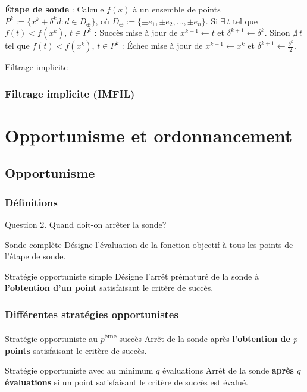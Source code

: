 \documentclass{beamer}
\newcommand\tab[1][1cm]{\hspace*{#1}}
\newcommand{\IMFIL}{\textsf{IMFIL}}
\begin{document}
\begin{frame}
\begin{algorithm}[H]
\begin{algorithmic}[]
\STATE \textbf{Étape de sonde} : Calcule $f(x)$ à un ensemble de points
\STATE $P^k:=\{x^k+\delta ^k d:d\in D_{\oplus}\}$, où $D_{\oplus} := \{\pm e_1,\pm e_2,\dots,\pm e_n\}$.
\STATE
\STATE Si $\exists~t$ tel que $f(t) < f(x^k)$, $t\in P^k$ : Succès
\STATE \tab mise à jour de $x^{k+1}\leftarrow t$ et $\delta^{k+1} \leftarrow \delta^k$.
\STATE
\STATE Sinon $\nexists~t$ tel que $f(t) < f(x^k)$, $t\in P^k$ : Échec
\STATE \tab mise à jour de $x^{k+1}\leftarrow x^k$ et $\delta^{k+1} \leftarrow \frac{\delta^k}{2}$.
\ENDFOR
\end{algorithmic}
\caption{Filtrage implicite}
\label{alg:cs}
\end{algorithm}
\frametitle{Filtrage implicite (\IMFIL)}
\end{frame}

\section{Opportunisme et ordonnancement}
\tableofcontents[currentsection,currentsubsection,subsectionstyle=show/hide]
\subsection{Opportunisme}
\begin{frame}
\frametitle{Définitions}
\begin{exampleblock}{Question 2.}
Quand doit-on arrêter la sonde?
\end{exampleblock}
\pause
\bigskip

\pause
\bigskip

{\begin{block}{Sonde complète}
Désigne l'évaluation de la fonction objectif à tous les points de l'étape de sonde.
\end{block}}
\pause
\bigskip

\begin{block}{Stratégie opportuniste simple}
	Désigne l'arrêt prématuré de la sonde à \textbf{l'obtention d'un point} satisfaisant le critère de succès. 
\end{block}
\end{frame}
\begin{frame}
\frametitle{Différentes stratégies opportunistes}

\begin{block}{Stratégie opportuniste au $p$\textsuperscript{ème} succès}
Arrêt de la sonde après \textbf{l'obtention de $p$ points} satisfaisant le critère de succès.\end{block}
\pause
\medskip

{\begin{block}{Stratégie opportuniste avec au minimum $q$ évaluations}
Arrêt de la sonde \textbf{après $q$ évaluations} si un point satisfaisant le critère de succès est évalué. \end{block}}
\end{frame}
\end{document}
